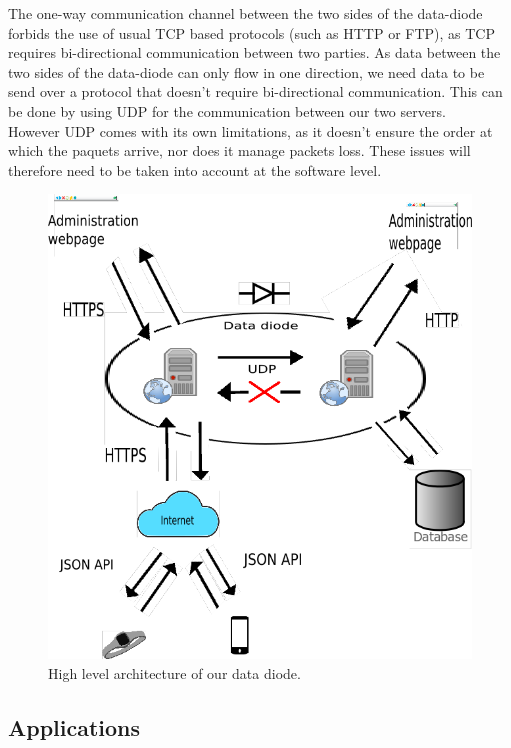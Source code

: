 \documentclass[a4paper,11pt]{article}
\begin{document}
The one-way communication channel between the two sides of the data-diode forbids the use of usual TCP based protocols (such as HTTP or FTP), as TCP requires bi-directional communication between two parties. As data between the two sides of the data-diode can only flow in one direction, we need data to be send over a protocol that doesn't require bi-directional communication. This can be done by using UDP for the communication between our two servers.\\

However UDP comes with its own limitations, as it doesn't ensure the order at which the paquets arrive, nor does it manage packets loss. These issues will therefore need to be taken into account at the software level.\\


\begin{figure}
	\includegraphics[scale=0.7]{img/system.png}
	\caption{High level architecture of our data diode.}
\end{figure}


\subsection{Applications}
\end{document}
